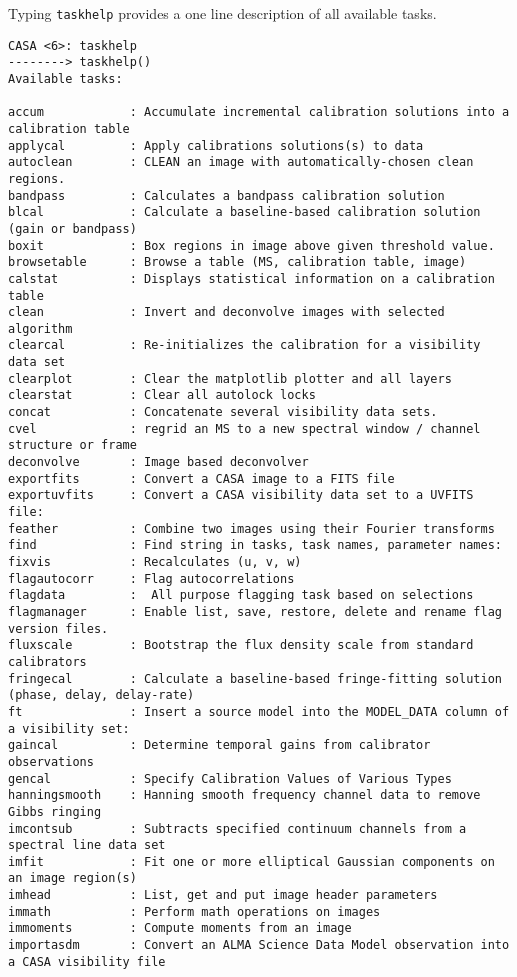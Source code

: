 Typing {\tt taskhelp} provides a one line description of all available
tasks.
\small
\begin{verbatim}
CASA <6>: taskhelp
--------> taskhelp()
Available tasks: 

accum            : Accumulate incremental calibration solutions into a calibration table
applycal         : Apply calibrations solutions(s) to data
autoclean        : CLEAN an image with automatically-chosen clean regions.
bandpass         : Calculates a bandpass calibration solution
blcal            : Calculate a baseline-based calibration solution (gain or bandpass)
boxit            : Box regions in image above given threshold value.
browsetable      : Browse a table (MS, calibration table, image)
calstat          : Displays statistical information on a calibration table
clean            : Invert and deconvolve images with selected algorithm
clearcal         : Re-initializes the calibration for a visibility data set
clearplot        : Clear the matplotlib plotter and all layers
clearstat        : Clear all autolock locks
concat           : Concatenate several visibility data sets.
cvel             : regrid an MS to a new spectral window / channel structure or frame
deconvolve       : Image based deconvolver
exportfits       : Convert a CASA image to a FITS file
exportuvfits     : Convert a CASA visibility data set to a UVFITS file:
feather          : Combine two images using their Fourier transforms
find             : Find string in tasks, task names, parameter names:
fixvis           : Recalculates (u, v, w)
flagautocorr     : Flag autocorrelations
flagdata         :  All purpose flagging task based on selections
flagmanager      : Enable list, save, restore, delete and rename flag version files.
fluxscale        : Bootstrap the flux density scale from standard calibrators
fringecal        : Calculate a baseline-based fringe-fitting solution (phase, delay, delay-rate)
ft               : Insert a source model into the MODEL_DATA column of a visibility set:
gaincal          : Determine temporal gains from calibrator observations
gencal           : Specify Calibration Values of Various Types
hanningsmooth    : Hanning smooth frequency channel data to remove Gibbs ringing
imcontsub        : Subtracts specified continuum channels from a spectral line data set
imfit            : Fit one or more elliptical Gaussian components on an image region(s)
imhead           : List, get and put image header parameters
immath           : Perform math operations on images
immoments        : Compute moments from an image
importasdm       : Convert an ALMA Science Data Model observation into a CASA visibility file

\end{verbatim}
